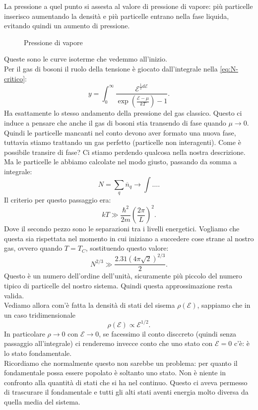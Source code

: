 La pressione a quel punto si assesta al valore di pressione di vapore: più particelle inserisco aumentando la densità e più particelle entrano nella fase liquida, evitando quindi un aumento di pressione.
\begin{figure}[H]
    \centering
    \caption{Pressione di vapore}
    \label{fig:pressione-di-vapore}
\end{figure}
\noindent
Queste sono le curve isoterme che vedemmo all'inizio.\\
Per il gas di bosoni il ruolo della tensione è giocato dall'integrale nella \ref{eq:N-critico}:
\[
	y =\int_{0}^{\infty} \frac{\mathcal{E} ^{\frac{1}{2}d\mathcal{E} }}{\exp\left( \frac{\mathcal{E} -\mu }{kT} \right)-1 } 
.\] 
Ha esattamente lo stesso andamento della pressione del gas classico. Questo ci induce a pensare che anche il gas di bosoni stia transendo di fase quando $\mu \to 0$.\\
Quindi le particelle mancanti nel conto devono aver formato una nuova fase, tuttavia stiamo trattando un gas perfetto (particelle non interagenti). Come è possibile transire di fase? Ci stiamo perdendo qualcosa nella nostra descrizione.\\
Ma le particelle le abbiamo calcolate nel modo giusto, passando da somma a integrale:
\[
	N = \sum_{q}^{} \overline{n}_{q} \to \int\ldots
.\] 
Il criterio per questo passaggio era:  \[
	kT \gg \frac{\hbar^2}{2m}\left( \frac{2\pi}{L} \right) ^2
.\] Dove il secondo pezzo sono le separazioni tra i livelli energetici. Vogliamo che questa sia rispettata nel momento in cui iniziano a succedere cose strane al nostro gas, ovvero quando $T = T_{C}$, sostituendo questo valore:
\[
	N^{2 /3} \gg \frac{2.31 \left( 4\pi\sqrt{2}  \right)^{2 /3}}{2}
.\] 
Questo è un numero dell'ordine dell'unità, sicuramente più piccolo del numero tipico di particelle del nostro sistema. Quindi questa approssimazione resta valida.\\
Vediamo allora com'è fatta la densità di stati del sisema $\rho ( \mathcal{E} ) $, sappiamo che in un caso tridimensionale  
\[
	\rho ( \mathcal{E} ) \propto \mathcal{E} ^{1 /2}
.\] 
In particolare $\rho \to 0$ con $\mathcal{E} \to 0$, se facessimo il conto disccreto (quindi senza passaggio all'integrale) ci renderemo invecce conto che uno stato con $\mathcal{E} = 0 $ c'è: è lo stato fondamentale. \\
Ricordiamo che normalmente questo non sarebbe un problema: per quanto il fondamentale possa essere popolato è soltanto uno stato. Non è niente in confronto alla quantità di stati che si ha nel continuo. Questo ci aveva permesso di trascurare il fondamentale e tutti gli alti stati aventi energia molto diversa da quella media del sistema.\\
